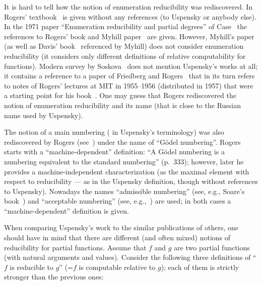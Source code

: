\documentclass[12pt]{article}
\theoremstyle{remark}
\begin{document}
It is hard to tell how the notion of enumeration reducibility was rediscovered. In Rogers' textbook~\cite{Rogers1972} is given without any references (to Uspensky or anybody else). In the 1971 paper ``Enumeration reducibility and partial degrees'' of Case~\cite{Case1971} the references to Rogers' book and Myhill paper~\cite{Myhill1961} are given. However, Myhill's paper (as well as Davis' book~\cite{Davis1958} referenced by Myhill) does not consider enumeration reducibility (it considers only different definitions of relative computability for functions). Modern survey by Soskova~\cite{Soskova2013} does not mention Uspensky's works at all; it contains a reference to a paper of Friedberg and Rogers~\cite{FriedbergRogers1959} that in its turn refers to notes of Rogers' lectures at MIT in 1955--1956 (distributed in 1957) that were a starting point for his book~\cite{Rogers1972}. One may guess that Rogers rediscovered the notion of enumeration reducibility and its name (that is close to the Russian name  used by Uspensky).

The notion of a main numbering ( in Uspensky's terminology) was also rediscovered by Rogers (see~\cite{Rogers1958}) under the name of ``G\"{o}del numbering''. Rogers starts with a ``machine-dependent'' definition: ``A G\"{o}del numbering is a numbering equivalent to the standard numbering'' (p.~333); however, later he provides a machine-independent characterization (as the maximal element with respect to reducibility --- as in the Uspensky definition, though without references to Uspensky). Nowadays the names ``admissible numbering'' (see, e.g., Soare's book~\cite{Soare2016}) and ``acceptable numbering'' (see, e.g.,~\cite[Definition II.5.2]{Odifreddi1989}) are used; in both cases a ``machine-dependent'' definition is given.

When comparing Uspensky's work to the similar publications of others, one should have in mind that there are different (and often mixed) notions of reducibility for partial functions. Assume that $f$ and $g$ are two partial functions (with natural arguments and values). Consider the following three definitions of ``$f$ is reducible to $g$'' (=$f$ is computable relative to $g$); each of them is strictly stronger than the previous ones:
\end{document}
